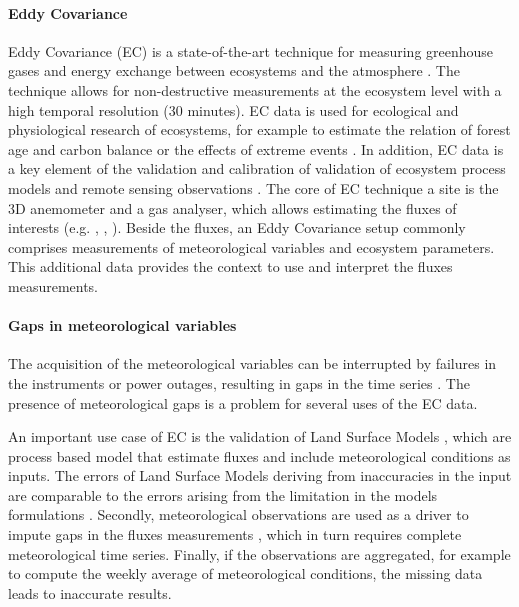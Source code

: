 \documentclass{article}
\begin{document}
\paragraph{Eddy Covariance} Eddy Covariance (EC) is a state-of-the-art technique for measuring greenhouse gases and energy exchange between ecosystems and the atmosphere \cite{aubinet_eddy_2012-1}.  The technique allows for non-destructive measurements at the ecosystem level with a high temporal resolution (30 minutes). EC data is used for ecological and physiological research of ecosystems, for example to estimate the relation of forest age and carbon balance \cite{besnard_quantifying_2018} or the effects of extreme events \cite{mahecha_detecting_2017}. In addition, EC data is a key element of the validation and calibration of validation of ecosystem process models and remote sensing observations \cite{papale_ideas_2020}.
The core of EC technique a site is the 3D anemometer and a gas analyser, which allows estimating the fluxes of interests (e.g. , , ). Beside the fluxes, an Eddy Covariance setup commonly comprises measurements of meteorological variables and ecosystem parameters. This additional data provides the context to use and interpret the fluxes measurements.

\paragraph{Gaps in meteorological variables} The acquisition of the meteorological variables can be interrupted by failures in the instruments or power outages, resulting in gaps in the time series \cite{aubinet_eddy_2012-1}.
The presence of meteorological gaps is a problem for several uses of the EC data.

An important use case of EC is the validation of Land Surface Models \cite{balzarolo_evaluating_2014, friend_fluxnet_2007-1, bonan_improving_2011-1, kramer_evaluation_2002}, which are process based model that estimate fluxes and include meteorological conditions as inputs. The errors of Land Surface Models deriving from inaccuracies in the input are comparable to the errors arising from the limitation in the models formulations \cite{zhao_how_2012}. 
Secondly, meteorological observations are used as a driver to impute gaps in the fluxes measurements \cite{aubinet_eddy_2012-1}, which in turn requires complete meteorological time series.
Finally, if the observations are aggregated, for example to compute the weekly average of meteorological conditions, the missing data leads to inaccurate results. 
\end{document}
